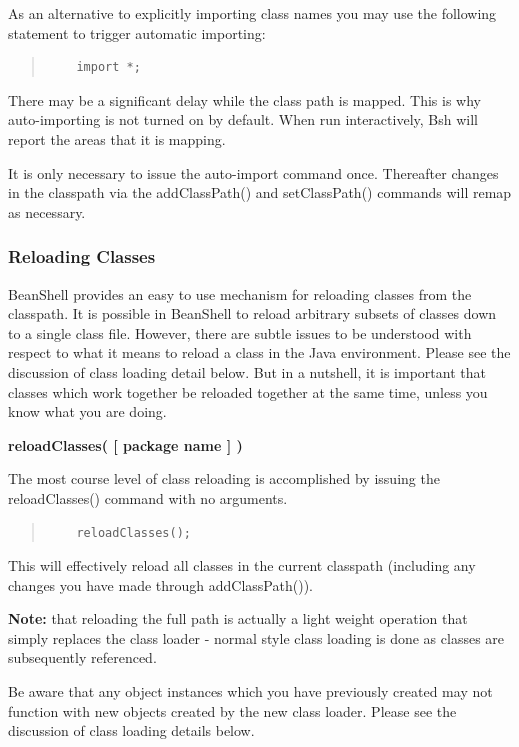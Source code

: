 \documentclass[twoside,11pt]{article}
\renewcommand{\_}{\texttt{\symbol{95}}}
\begin{document}
As an alternative to explicitly importing class names you may use the
following statement to trigger automatic importing:
\begin{quote}
\begin{verbatim}
    import *;
\end{verbatim}
\end{quote}

There may be a significant delay while the class path is mapped.  This
is why auto-importing is not turned on by default.  When run
interactively, Bsh will report the areas that it is mapping.

It is only necessary to issue the auto-import command once.
Thereafter changes in the classpath via the addClassPath() and
setClassPath() commands will remap as necessary.

\subsubsection{Reloading Classes}

BeanShell provides an easy to use mechanism for reloading classes from
the classpath.  It is possible in BeanShell to reload arbitrary
subsets of classes down to a single class file.  However, there are
subtle issues to be understood with respect to what it means to reload
a class in the Java environment.  Please see the discussion of class
loading detail below.  But in a nutshell, it is important that classes
which work together be reloaded together at the same time, unless you
know what you are doing.

\textbf{reloadClasses( [ package name ] )}

The most course level of class reloading is accomplished by issuing
the reloadClasses() command with no arguments.
\begin{quote}
\begin{verbatim}
    reloadClasses();
\end{verbatim}
\end{quote}

This will effectively reload all classes in the current classpath
(including any changes you have made through addClassPath()).

\textbf{Note:} that reloading the full path is actually a light weight operation that
simply replaces the class loader - normal style class loading is done
as classes are subsequently referenced.

Be aware that any object instances which you have previously created
may not function with new objects created by the new class loader.
Please see the discussion of class loading details below.
\end{document}
